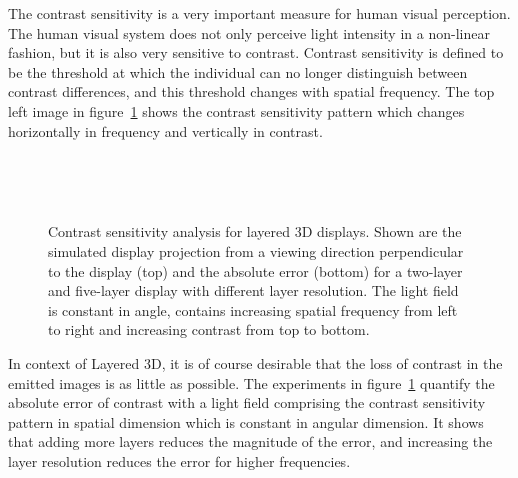 The contrast sensitivity is a very important measure for human visual perception.
The human visual system does not only perceive light intensity in a non-linear fashion, but it is also very sensitive to contrast.
Contrast sensitivity is defined to be the threshold at which the individual can no longer distinguish between contrast differences, and this threshold changes with spatial frequency.
The top left image in figure~\ref{fig:contrast_sensitivity} shows the contrast sensitivity pattern which changes horizontally in frequency and vertically in contrast.
\begin{figure}[tb]
	\begin{subfigure}{0.45\textwidth}
		
	\end{subfigure}\hfill%
	\begin{subfigure}{0.45\textwidth}
		
	\end{subfigure}%
	\\
	\begin{subfigure}{0.45\textwidth}
		
	\end{subfigure}\hfill%
	\begin{subfigure}{0.45\textwidth}
		
	\end{subfigure}%
	\\
	\begin{subfigure}{0.45\textwidth}
		
	\end{subfigure}\hfill%
	\begin{subfigure}{0.45\textwidth}
		
	\end{subfigure}%
	\caption[Contrast sensitivity analysis for layered 3D displays]
			{Contrast sensitivity analysis for layered 3D displays.
			 Shown are the simulated display projection from a viewing direction perpendicular to the display (top) and the absolute error (bottom) for a two-layer and five-layer display with different layer resolution.
			 The light field is constant in angle, contains increasing spatial frequency from left to right and increasing contrast from top to bottom.}
	\label{fig:contrast_sensitivity}
\end{figure}
In context of Layered 3D, it is of course desirable that the loss of contrast in the emitted images is as little as possible.
The experiments in figure~\ref{fig:contrast_sensitivity} quantify the absolute error of contrast with a light field comprising the contrast sensitivity pattern in spatial dimension which is constant in angular dimension.
It shows that adding more layers reduces the magnitude of the error, and increasing the layer resolution reduces the error for higher frequencies.

